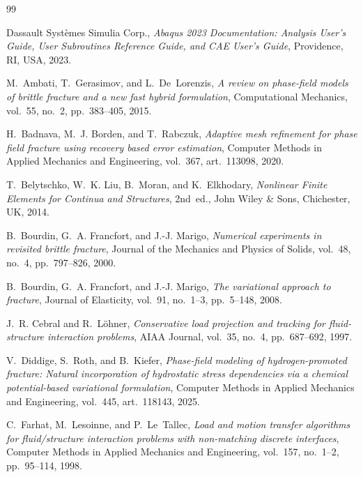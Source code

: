 \begin{thebibliography}{99}

Dassault Syst\`emes Simulia Corp.,
\textit{Abaqus 2023 Documentation: Analysis User's Guide, User Subroutines Reference Guide, and CAE User's Guide},
Providence, RI, USA, 2023.

M.~Ambati, T.~Gerasimov, and L.~De~Lorenzis,
\textit{A review on phase-field models of brittle fracture and a new fast hybrid formulation},
Computational Mechanics,
vol.~55, no.~2, pp.~383--405, 2015.

H.~Badnava, M.~J. Borden, and T.~Rabczuk,
\textit{Adaptive mesh refinement for phase field fracture using recovery based error estimation},
Computer Methods in Applied Mechanics and Engineering,
vol.~367, art.~113098, 2020.

T.~Belytschko, W.~K. Liu, B.~Moran, and K.~Elkhodary,
\textit{Nonlinear Finite Elements for Continua and Structures},
2nd~ed., John Wiley \& Sons, Chichester, UK, 2014.

B.~Bourdin, G.~A. Francfort, and J.-J. Marigo,
\textit{Numerical experiments in revisited brittle fracture},
Journal of the Mechanics and Physics of Solids,
vol.~48, no.~4, pp.~797--826, 2000.

B.~Bourdin, G.~A. Francfort, and J.-J. Marigo,
\textit{The variational approach to fracture},
Journal of Elasticity,
vol.~91, no.~1--3, pp.~5--148, 2008.

J.~R. Cebral and R.~L\"ohner,
\textit{Conservative load projection and tracking for fluid-structure interaction problems},
AIAA Journal,
vol.~35, no.~4, pp.~687--692, 1997.

V.~Diddige, S.~Roth, and B.~Kiefer,
\textit{Phase-field modeling of hydrogen-promoted fracture: Natural incorporation of hydrostatic stress dependencies via a chemical potential-based variational formulation},
Computer Methods in Applied Mechanics and Engineering,
vol.~445, art.~118143, 2025.

C.~Farhat, M.~Lesoinne, and P.~Le~Tallec,
\textit{Load and motion transfer algorithms for fluid/structure interaction problems with non-matching discrete interfaces},
Computer Methods in Applied Mechanics and Engineering,
vol.~157, no.~1--2, pp.~95--114, 1998.


\end{thebibliography}

